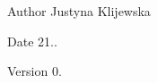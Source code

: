 \begin{DoxyAuthor}{Author}
Justyna Klijewska 
\end{DoxyAuthor}
\begin{DoxyDate}{Date}
21.. 
\end{DoxyDate}
\begin{DoxyVersion}{Version}
0. 
\end{DoxyVersion}
